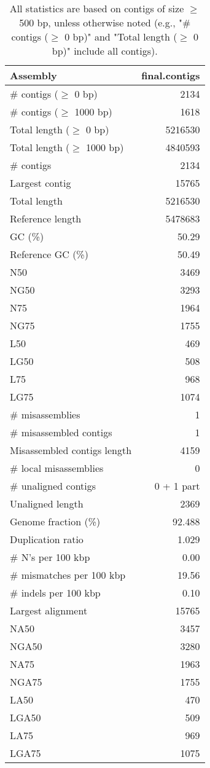 \documentclass[12pt,a4paper]{article}
\begin{document}
\begin{table}[ht]
\begin{center}
\caption{All statistics are based on contigs of size $\geq$ 500 bp, unless otherwise noted (e.g., "\# contigs ($\geq$ 0 bp)" and "Total length ($\geq$ 0 bp)" include all contigs).}
\begin{tabular}{|l*{1}{|r}|}
\hline
Assembly & final.contigs \\ \hline
\# contigs ($\geq$ 0 bp) & 2134 \\ \hline
\# contigs ($\geq$ 1000 bp) & 1618 \\ \hline
Total length ($\geq$ 0 bp) & 5216530 \\ \hline
Total length ($\geq$ 1000 bp) & 4840593 \\ \hline
\# contigs & 2134 \\ \hline
Largest contig & 15765 \\ \hline
Total length & 5216530 \\ \hline
Reference length & 5478683 \\ \hline
GC (\%) & 50.29 \\ \hline
Reference GC (\%) & 50.49 \\ \hline
N50 & 3469 \\ \hline
NG50 & 3293 \\ \hline
N75 & 1964 \\ \hline
NG75 & 1755 \\ \hline
L50 & 469 \\ \hline
LG50 & 508 \\ \hline
L75 & 968 \\ \hline
LG75 & 1074 \\ \hline
\# misassemblies & 1 \\ \hline
\# misassembled contigs & 1 \\ \hline
Misassembled contigs length & 4159 \\ \hline
\# local misassemblies & 0 \\ \hline
\# unaligned contigs & 0 + 1 part \\ \hline
Unaligned length & 2369 \\ \hline
Genome fraction (\%) & 92.488 \\ \hline
Duplication ratio & 1.029 \\ \hline
\# N's per 100 kbp & 0.00 \\ \hline
\# mismatches per 100 kbp & 19.56 \\ \hline
\# indels per 100 kbp & 0.10 \\ \hline
Largest alignment & 15765 \\ \hline
NA50 & 3457 \\ \hline
NGA50 & 3280 \\ \hline
NA75 & 1963 \\ \hline
NGA75 & 1755 \\ \hline
LA50 & 470 \\ \hline
LGA50 & 509 \\ \hline
LA75 & 969 \\ \hline
LGA75 & 1075 \\ \hline
\end{tabular}
\end{center}
\end{table}
\end{document}
